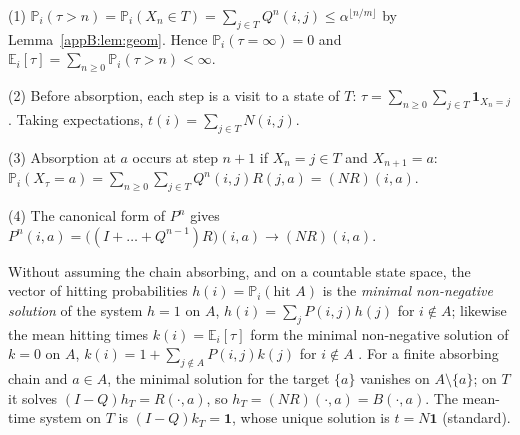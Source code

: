 \begin{humanproof}
(1) $\mathbb P_i(\tau>n)=\mathbb P_i(X_n\in T)=\sum_{j\in T}Q^n(i,j)\le\alpha^{\lfloor n/m\rfloor}$ by
Lemma~\ref{appB:lem:geom}. Hence $\mathbb P_i(\tau=\infty)=0$ and $\mathbb E_i[\tau]=\sum_{n\ge0}\mathbb P_i(\tau>n)<\infty$.

(2) Before absorption, each step is a visit to a state of $T$: $\tau=\sum_{n\ge0}\sum_{j\in T}\mathbf 1_{X_n=j}$.
Taking expectations, $t(i)=\sum_{j\in T}N(i,j)$.

(3) Absorption at $a$ occurs at step $n+1$ if $X_n=j\in T$ and $X_{n+1}=a$:
$\mathbb P_i(X_\tau=a)=\sum_{n\ge0}\sum_{j\in T}Q^n(i,j)R(j,a)=(NR)(i,a)$.

(4) The canonical form of $P^n$ gives $P^n(i,a)=\bigl((I+\dots+Q^{n-1})R\bigr)(i,a)\to(NR)(i,a)$.
\end{humanproof}

\begin{uniremark}\tierL{} Without assuming the chain absorbing, and on a countable state space, the vector of
hitting probabilities $h(i)=\mathbb P_i(\text{hit }A)$ is the \emph{minimal non-negative solution} of the system
$h=1$ on $A$, $h(i)=\sum_jP(i,j)h(j)$ for $i\notin A$; likewise the mean hitting times $k(i)=\mathbb E_i[\tau]$ form the
minimal non-negative solution of $k=0$ on $A$, $k(i)=1+\sum_{j\notin A}P(i,j)k(j)$ for $i\notin A$
\cite{app:norris}. For a finite absorbing chain and $a\in A$, the minimal solution for the target $\{a\}$ vanishes on
$A\setminus\{a\}$; on $T$ it solves $(I-Q)h_T=R(\cdot,a)$, so $h_T=(NR)(\cdot,a)=B(\cdot,a)$. The mean-time system on $T$
is $(I-Q)k_T=\mathbf 1$, whose unique solution is $t=N\mathbf 1$ \cite{app:norris} (standard).
\end{uniremark}

